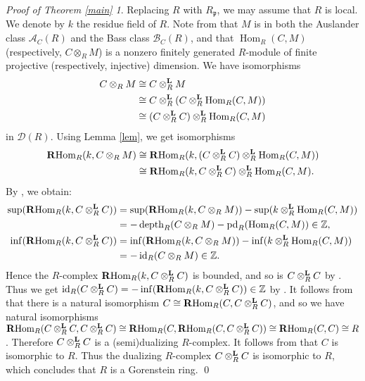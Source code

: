 \documentclass[a4, 10pt]{amsart}
\theoremstyle{plain}
\theoremstyle{definition}
\theoremstyle{remark}
\newtheorem*{tpf}{{\it Proof of Theorem \ref{main}}}
\def\Hom{\operatorname{Hom}}
\def\RHom{\operatorname{{\bf R}Hom}}
\def\p{\mathfrak p}
\def\Z{\Bbb Z}
\def\depth{\operatorname{depth}}
\def\pd{\operatorname{pd}}
\def\id{\operatorname{id}}
\def\A{{\mathcal A}}
\def\B{{\mathcal B}}
\def\D{{\mathcal D}}
\begin{document}
\begin{tpf}
Replacing $R$ with $R_\p$, we may assume that $R$ is local.
We denote by $k$ the residue field of $R$.
Note from \cite[(2.9)--(2.11)]{cdim} that $M$ is in both the Auslander class $\A_C(R)$ and the Bass class $\B_C(R)$, and that $\Hom_R(C,M)$ (respectively, $C\otimes_RM$) is a nonzero finitely generated $R$-module of finite projective (respectively, injective) dimension.
We have isomorphisms
\begin{align*}
C\otimes_RM & \cong C\otimes_R^{\bf L}M \\
& \cong C\otimes_R^{\bf L}(C\otimes_R^{\bf L}\Hom_R(C,M)) \\
& \cong (C\otimes_R^{\bf L}C)\otimes_R^{\bf L}\Hom_R(C,M)
\end{align*}
in $\D(R)$.
Using Lemma \ref{lem}, we get isomorphisms
\begin{align*}
\RHom_R(k,C\otimes_RM) & \cong \RHom_R(k,(C\otimes_R^{\bf L}C)\otimes_R^{\bf L}\Hom_R(C,M)) \\
& \cong \RHom_R(k,C\otimes_R^{\bf L}C)\otimes_R^{\bf L}\Hom_R(C,M).
\end{align*}
By \cite[(A.7.9)]{Cb}, we obtain:
\begin{align*}
\sup(\RHom_R(k,C\otimes_R^{\bf L}C)) & =\sup(\RHom_R(k,C\otimes_RM))-\sup(k\otimes_R^{\bf L}\Hom_R(C,M)) \\
& =-\depth_R(C\otimes_RM)-\pd_R(\Hom_R(C,M))\in\Z,\\
\inf(\RHom_R(k,C\otimes_R^{\bf L}C)) & =\inf(\RHom_R(k,C\otimes_RM))-\inf(k\otimes_R^{\bf L}\Hom_R(C,M)) \\
& =-\id_R(C\otimes_RM)\in\Z.
\end{align*}
Hence the $R$-complex $\RHom_R(k,C\otimes_R^{\bf L}C)$ is bounded, and so is $C\otimes_R^{\bf L}C$ by \cite[(2.5)]{FI}.
Thus we get $\id_R(C\otimes_R^{\bf L}C)=-\inf(\RHom_R(k,C\otimes_R^{\bf L}C))\in\Z$ by \cite[(A.5.7.4)]{Cb}.
It follows from \cite[(4.4) and (4.6)(a)]{Cp} that there is a natural isomorphism $C\cong\RHom_R(C,C\otimes_R^{\bf L}C)$, and so we have natural isomorphisms $\RHom_R(C\otimes_R^{\bf L}C,C\otimes_R^{\bf L}C)\cong\RHom_R(C,\RHom_R(C,C\otimes_R^{\bf L}C))\cong\RHom_R(C,C)\cong R$.
Therefore $C\otimes_R^{\bf L}C$ is a (semi)dualizing $R$-complex.
It follows from \cite[(3.2)]{FS} that $C$ is isomorphic to $R$.
Thus the dualizing $R$-complex $C\otimes_R^{\bf L}C$ is isomorphic to $R$, which concludes that $R$ is a Gorenstein ring.
\qed
\end{tpf}

\end{document}
